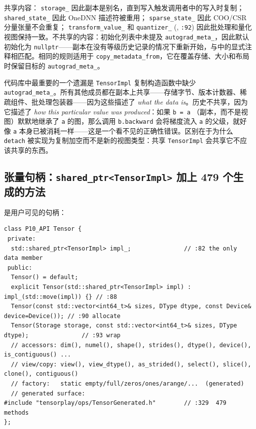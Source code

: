共享内容： \texttt{storage\_} 因此副本是别名，直到写入触发调用者中的写入时复制； \texttt{shared\_state\_} 因此 OneDNN 描述符被重用； \texttt{sparse\_state\_} 因此 COO/CSR 分量张量不会重复； \texttt{transform\_value\_} 和 \texttt{quantizer\_} (, \texttt{:92}) 因此批处理和量化视图保持一致。不共享的内容：初始化列表中未提及 \texttt{autograd\_meta\_}，因此默认初始化为 \texttt{nullptr}——副本在没有等级历史记录的情况下重新开始，与中的显式注释相匹配。相同的规则适用于 \texttt{copy\_metadata\_from}，它在覆盖存储、大小和布局时保留目标的 \texttt{autograd\_meta\_}。

\begin{tpinsight}
代码库中最重要的一个遗漏是 \texttt{TensorImpl} 复制构造函数中缺少 \texttt{autograd\_meta\_}。所有其他成员都在副本上共享——存储字节、版本计数器、稀疏组件、批处理包装器——因为这些描述了 \emph{what the data is}。历史不共享，因为它描述了 \emph{how this particular value was produced}：如果 \texttt{b = a} （副本，而不是视图）默默地继承了 \texttt{a} 的图，那么调用 \texttt{b.backward} 会将梯度流入 \texttt{a} 的父级，就好像 \texttt{a} 本身已被消耗一样——这是一个看不见的正确性错误。区别在于为什么 \texttt{detach} 被实现为复制加空而不是新的视图类型：共享 \texttt{TensorImpl} 会共享它不应该共享的东西。
\end{tpinsight}

\subsection{张量句柄：\texttt{shared\_ptr<TensorImpl>} 加上 479 个生成的方法}
\label{sec:tensorhandle}

是用户可见的句柄：

\begin{lstlisting}[caption={handle.}, label=lst:tensorhandle]
class P10_API Tensor {
 private:
  std::shared_ptr<TensorImpl> impl_;               // :82 the only data member
 public:
  Tensor() = default;
  explicit Tensor(std::shared_ptr<TensorImpl> impl) : impl_(std::move(impl)) {} // :88
  Tensor(const std::vector<int64_t>& sizes, DType dtype, const Device& device=Device()); // :90 allocate
  Tensor(Storage storage, const std::vector<int64_t>& sizes, DType dtype);               // :93 wrap
  // accessors: dim(), numel(), shape(), strides(), dtype(), device(), is_contiguous() ...
  // view/copy: view(), view_dtype(), as_strided(), select(), slice(), clone(), contiguous()
  // factory:   static empty/full/zeros/ones/arange/...  (generated)
  // generated surface:
#include "tensorplay/ops/TensorGenerated.h"        // :329  479 methods
};
\end{lstlisting}

